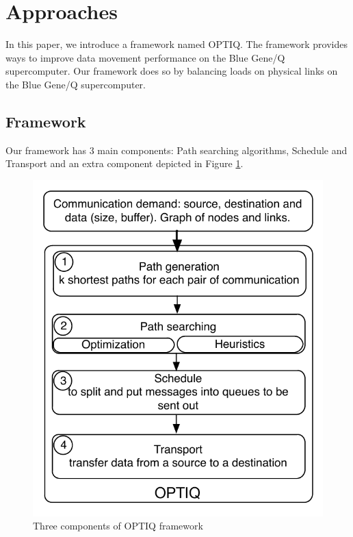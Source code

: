 \section{Approaches}
In this paper, we introduce a framework named OPTIQ. The framework provides ways to improve data movement performance on the Blue Gene/Q supercomputer. Our framework does so by balancing loads on physical links on the Blue Gene/Q supercomputer.

\subsection{Framework}

Our framework has 3 main components: Path searching algorithms, Schedule and Transport and an extra component depicted in Figure \ref{fig:framework}.

\begin{figure}[!htb]
\vspace{-0.1in}
\centering
\includegraphics[scale=0.7]{figures/framework.pdf}
\vspace{-0.2in}
\caption{Three components of OPTIQ framework}
\vspace{-0.1in}
\label{fig:framework}
\end{figure}

